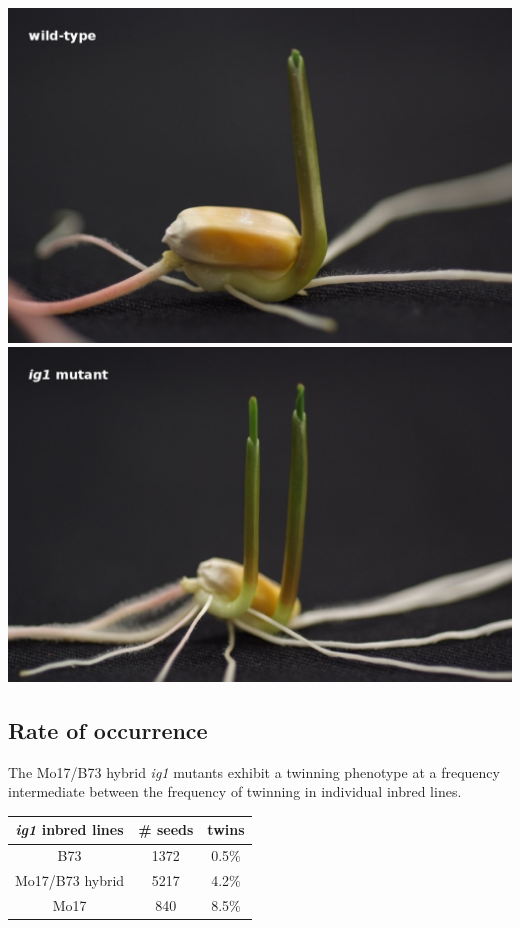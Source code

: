 \documentclass[maize,portrait]{a0poster}
\newlength{\figwidth}
\begin{document}
\begin{multicols}{3}
\begin{center}
\begin{minipage}[t]{1.0\linewidth}
      \includegraphics[width=0.5\figwidth]{Tang-seedling-wt}
      \includegraphics[width=0.5\figwidth]{Tang-seedling-twin}
    \end{minipage}
  \end{center}

  \subsection*{Rate of occurrence}

  The Mo17/B73 hybrid \textit{ig1} mutants exhibit a twinning phenotype at a frequency intermediate between the frequency of
  twinning in individual inbred lines.

  \begin{center}
    \begin{tabular}{|c|c|c|}
      \hline
      \textit{ig1} inbred lines & \# seeds & twins \\
      \hline
      B73 & 1372 & 0.5\% \\
      Mo17/B73 hybrid & 5217 & 4.2\% \\
      Mo17 & 840 & 8.5\% \\
      \hline
    \end{tabular}
  \end{center}


\end{multicols}
\end{document}
